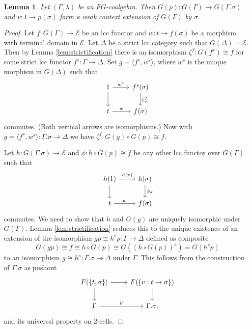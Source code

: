 \documentclass[a4paper]{article}
\newtheorem{lemma}[theorem]{Lemma}
\theoremstyle{remark}
\theoremstyle{definition}
\begin{document}
\begin{lemma}
  \label{lem:strict-ext-is-weak-ext}
  Let $(\Gamma, \lambda)$ be an $FG$-coalgebra.
  Then $G(p) : G(\Gamma) \rightarrow G(\Gamma.\sigma)$ and $v : 1 \rightarrow p(\sigma)$ form a weak context extension of $G(\Gamma)$ by $\sigma$.
\end{lemma}
\begin{proof}
  Let $f : G(\Gamma) \rightarrow \mathcal{E}$ be an lcc functor and $w : t \rightarrow  f(\sigma)$ be a morphism with terminal domain in $\mathcal{E}$.
  Let $\Delta$ be a strict lcc category such that $G(\Delta) = \mathcal{E}$.
  Then by Lemma \ref{lem:strictification} there is an isomorphism $\zeta^f : G(f^s) \cong f$ for some strict lcc functor $f^s : \Gamma \rightarrow \Delta$.
  Set $g = \langle f^s, w^s \rangle$, where $w^s$ is the unique morphism in $G(\Delta)$ such that
  \begin{equation}
    \begin{tikzcd}
      1 \arrow[d] \arrow[r, "w^s"] & f^s(\sigma) \arrow[d, "\zeta^f_\sigma"] \\
      t \arrow[r, "w"] & f(\sigma)
    \end{tikzcd}
  \end{equation}
  commutes.
  (Both vertical arrows are isomorphisms.)
  Now with $g = \langle f^s, w^s \rangle : \Gamma.\sigma \rightarrow \Delta$ we have $\zeta^f : G(g) \circ G(p) \cong f$.

  Let $h : G(\Gamma.\sigma) \rightarrow \mathcal{E}$ and $\phi : h \circ G(p) \cong f$ be any other lcc functor over $G(\Gamma)$ such that
  \begin{equation}
    \begin{tikzcd}
      h(1) \arrow[d] \arrow[r, "h(v)"] & h(\sigma) \arrow[d, "\phi_\sigma"] \\
      t \arrow[r, "w"] & f(\sigma)
    \end{tikzcd}
  \end{equation}
  commutes.
  We need to show that $h$ and $G(g)$ are uniquely isomorphic under $G(\Gamma)$.
  Lemma \ref{lem:strictification} reduces this to the unique existence of an extension of the isomorphism $g p \cong h^s p : \Gamma \rightarrow \Delta$ defined as composite
  \begin{equation}
    G(gp) \cong f \cong h \circ G(p) \cong G((h \circ G(p))^s) = G(h^s p)
  \end{equation}
  to an isomorphism $g \cong h^s : \Gamma.\sigma \rightarrow \Delta$ under $\Gamma$.
  This follows from the construction of $\Gamma.\sigma$ as pushout
  \begin{equation}
    \begin{tikzcd}
      F(\{ t, \sigma \}) \arrow[d] \arrow[r] & F(\{ v : t \rightarrow \sigma \}) \arrow[d] \\
      \Gamma \arrow[r, "p"] & \Gamma.\sigma,
    \end{tikzcd}
  \end{equation}
  and its universal property on 2-cells.
\end{proof}
\end{document}
